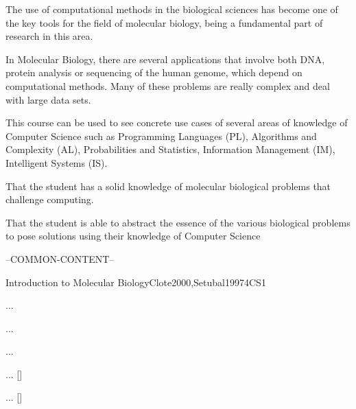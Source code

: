 \begin{syllabus}

	
	\begin{justification}
	The use of computational methods in the biological sciences has become one of the key tools for the field of molecular biology, being a fundamental part of research in this area.
	
	In Molecular Biology, there are several applications that involve both DNA, protein analysis or sequencing of the human genome, which depend on computational methods. Many of these problems are really complex and deal with large data sets.
	
	This course can be used to see concrete use cases of several areas of knowledge of Computer Science such as Programming Languages (PL), Algorithms and Complexity (AL), Probabilities and Statistics, Information Management (IM), Intelligent Systems (IS).
	\end{justification}
	
	\begin{goals}
	\item That the student has a solid knowledge of molecular biological problems that challenge computing.
	\item That the student is able to abstract the essence of the various biological problems to pose solutions using their knowledge of Computer Science
	\end{goals}
	
	--COMMON-CONTENT--
	
	\begin{unit}{Introduction to Molecular Biology}{}{Clote2000,Setubal1997}{4}{CS1}
		 \begin{topics}
			\item ...
			\item ...
			\item ...
		 \end{topics}
		 \begin{learningoutcomes}
				\item ... [\Familiarity]
				\item ... [\Assessment]
		 \end{learningoutcomes}
	\end{unit}
	
	\begin{coursebibliography}
	\end{coursebibliography}
	
	\end{syllabus}
	